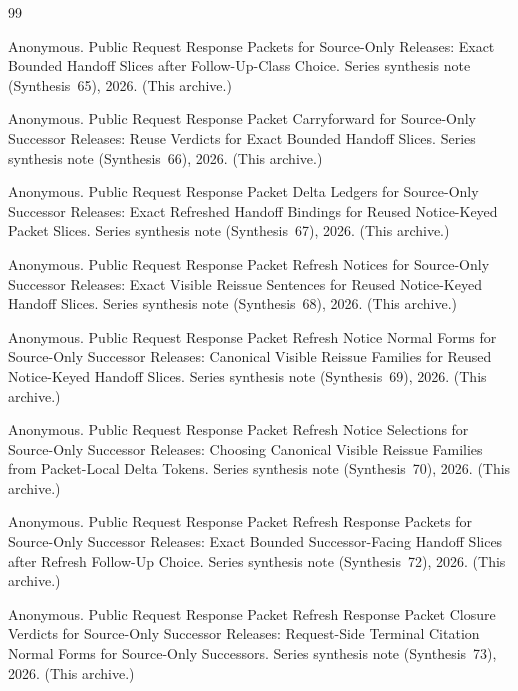 \documentclass[11pt]{article}
\begin{document}
\begin{thebibliography}{99}\small

Anonymous.
\newblock Public Request Response Packets for Source-Only Releases: Exact Bounded Handoff Slices after Follow-Up-Class Choice.
\newblock Series synthesis note (Synthesis~65), 2026. (This archive.)

Anonymous.
\newblock Public Request Response Packet Carryforward for Source-Only Successor Releases: Reuse Verdicts for Exact Bounded Handoff Slices.
\newblock Series synthesis note (Synthesis~66), 2026. (This archive.)

Anonymous.
\newblock Public Request Response Packet Delta Ledgers for Source-Only Successor Releases: Exact Refreshed Handoff Bindings for Reused Notice-Keyed Packet Slices.
\newblock Series synthesis note (Synthesis~67), 2026. (This archive.)

Anonymous.
\newblock Public Request Response Packet Refresh Notices for Source-Only Successor Releases: Exact Visible Reissue Sentences for Reused Notice-Keyed Handoff Slices.
\newblock Series synthesis note (Synthesis~68), 2026. (This archive.)

Anonymous.
\newblock Public Request Response Packet Refresh Notice Normal Forms for Source-Only Successor Releases: Canonical Visible Reissue Families for Reused Notice-Keyed Handoff Slices.
\newblock Series synthesis note (Synthesis~69), 2026. (This archive.)

Anonymous.
\newblock Public Request Response Packet Refresh Notice Selections for Source-Only Successor Releases: Choosing Canonical Visible Reissue Families from Packet-Local Delta Tokens.
\newblock Series synthesis note (Synthesis~70), 2026. (This archive.)

Anonymous.
\newblock Public Request Response Packet Refresh Response Packets for Source-Only Successor Releases: Exact Bounded Successor-Facing Handoff Slices after Refresh Follow-Up Choice.
\newblock Series synthesis note (Synthesis~72), 2026. (This archive.)

Anonymous.
\newblock Public Request Response Packet Refresh Response Packet Closure Verdicts for Source-Only Successor Releases: Request-Side Terminal Citation Normal Forms for Source-Only Successors.
\newblock Series synthesis note (Synthesis~73), 2026. (This archive.)


\end{thebibliography}
\end{document}
